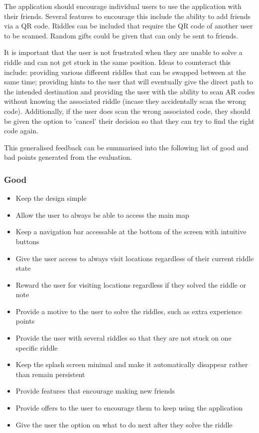 \documentclass[10pt,twocolumn]{article} %
\begin{document}
The application should encourage individual users to use the application with their friends. Several features to encourage this include the ability to add friends via a QR code. Riddles can be included that require the QR code of another user to be scanned. Random gifts could be given that can only be sent to friends.

It is important that the user is not frustrated when they are unable to solve a riddle and can not get stuck in the same position. Ideas to counteract this include: providing various different riddles that can be swapped between at the same time; providing hints to the user that will eventually give the direct path to the intended destination and providing the user with the ability to scan AR codes without knowing the associated riddle (incase they accidentally scan the wrong code). Additionally, if the user does scan the wrong associated code, they should be given the option to 'cancel' their decision so that they can try to find the right code again.

This generalised feedback can be summarised into the following list of good and bad points generated from the evaluation.

\subsubsection*{Good}
\begin{itemize}[noitemsep]
  \item Keep the design simple
  \item Allow the user to always be able to access the main map
  \item Keep a navigation bar accessable at the bottom of the screen with intuitive buttons
  \item Give the user access to always visit locations regardless of their current riddle state
  \item Reward the user for visiting locations regardless if they solved the riddle or note
  \item Provide a motive to the user to solve the riddles, such as extra experience points
  \item Provide the user with several riddles so that they are not stuck on one specific riddle
  \item Keep the splash screen minimal and make it automatically disappear rather than remain persistent
  \item Provide features that encourage making new friends
  \item Provide offers to the user to encourage them to keep using the application
  \item Give the user the option on what to do next after they solve the riddle
\end{itemize}
\end{document}
